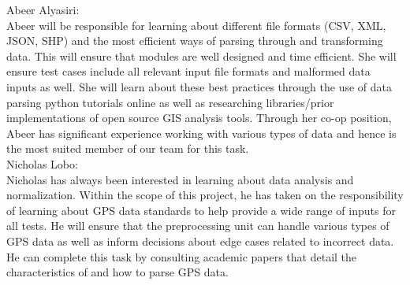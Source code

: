 \documentclass[12pt, titlepage]{article}
\begin{document}
\noindent Abeer Alyasiri:\\ Abeer will be responsible for learning about different file formats (CSV, XML, JSON, SHP) and the most efficient ways of parsing through and transforming data. This will ensure that modules are well designed and time efficient. She will ensure test cases include all relevant input file formats and malformed data inputs as well. She will learn about these best practices through the use of data parsing python tutorials online as well as researching libraries/prior implementations of open source GIS analysis tools. Through her co-op position, Abeer has significant experience working with various types of data and hence is the most suited member of our team for this task.   \\

\noindent Nicholas Lobo: \\
Nicholas has always been interested in learning about data analysis and normalization. Within the scope of this project, he has taken on the responsibility of learning about GPS data standards to help provide a wide range of inputs for all tests. He will ensure that the preprocessing unit can handle various types of GPS data as well as inform decisions about edge cases related to incorrect data. He can complete this task by consulting academic papers that detail the characteristics of and how to parse GPS data.\\
\end{document}
